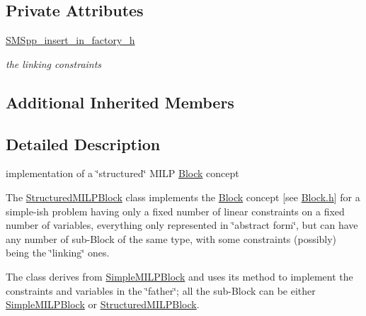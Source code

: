 \subsection*{Private Attributes}
\begin{DoxyCompactItemize}
\item 
\mbox{\label{class_s_m_spp__di__unipi__it_1_1_structured_m_i_l_p_block_a5618a1c2a09ff7cd62e4de9df7956672}} 
\mbox{\hyperlink{class_s_m_spp__di__unipi__it_1_1_structured_m_i_l_p_block_a5618a1c2a09ff7cd62e4de9df7956672}{S\+M\+Spp\+\_\+insert\+\_\+in\+\_\+factory\+\_\+h}}
\begin{DoxyCompactList}\small\item\em the linking constraints \end{DoxyCompactList}\end{DoxyCompactItemize}
\subsection*{Additional Inherited Members}


\subsection{Detailed Description}
implementation of a \char`\"{}structured\char`\"{} M\+I\+LP \mbox{\hyperlink{class_s_m_spp__di__unipi__it_1_1_block}{Block}} concept 

The \mbox{\hyperlink{class_s_m_spp__di__unipi__it_1_1_structured_m_i_l_p_block}{Structured\+M\+I\+L\+P\+Block}} class implements the \mbox{\hyperlink{class_s_m_spp__di__unipi__it_1_1_block}{Block}} concept \mbox{[}see \mbox{\hyperlink{_block_8h}{Block.\+h}}\mbox{]} for a simple-\/ish problem having only a fixed number of linear constraints on a fixed number of variables, everything only represented in \char`\"{}abstract
form\char`\"{}, but can have any number of sub-\/\+Block of the same type, with some constraints (possibly) being the \char`\"{}linking\char`\"{} ones.

The class derives from \mbox{\hyperlink{class_s_m_spp__di__unipi__it_1_1_simple_m_i_l_p_block}{Simple\+M\+I\+L\+P\+Block}} and uses its method to implement the constraints and variables in the \char`\"{}father\char`\"{}; all the sub-\/\+Block can be either \mbox{\hyperlink{class_s_m_spp__di__unipi__it_1_1_simple_m_i_l_p_block}{Simple\+M\+I\+L\+P\+Block}} or \mbox{\hyperlink{class_s_m_spp__di__unipi__it_1_1_structured_m_i_l_p_block}{Structured\+M\+I\+L\+P\+Block}}. 

